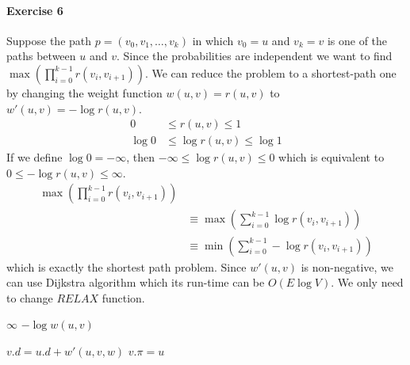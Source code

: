 \documentclass{book}
\begin{document}
	\paragraph{Exercise 6}
	Suppose the path $p = (v_0, v_1, \dots, v_k)$ in which $v_0 = u$ and $v_k = v$ is one of the paths between $u$ and $v$. Since the probabilities are independent we want to find $\max(\prod_{i = 0}^{k - 1}r(v_i, v_{i+1}))$. We can reduce the problem to a shortest-path one by changing the weight function $w(u, v) = r(u, v)$ to $w'(u, v) = -\log{r(u, v)}$.
	\begin{equation*}
	\begin{split}
		0 &\le r(u, v) \le 1 \\
		\log 0 &\le \log{r(u, v)} \le \log 1
	\end{split}
	\end{equation*}
	If we define $\log 0 = -\infty$, then $-\infty \le \log{r(u, v)} \le 0$ which is equivalent to $0 \le -\log{r(u, v)} \le \infty$.
	\begin{equation*}
	\begin{split}
		\max(\prod_{i = 0}^{k - 1}r(v_i, v_{i+1})) \\
		&\equiv \max(\sum_{i = 0}^{k - 1}\log{r(v_i, v_{i+1})}) \\
		&\equiv \min(\sum_{i = 0}^{k - 1}-\log{r(v_i, v_{i+1})})
	\end{split}
	\end{equation*}
	which is exactly the shortest path problem. Since $w'(u, v)$ is non-negative, we can use Dijkstra algorithm which its run-time can be $O(E\log V)$. We only need to change $RELAX$ function.
	\begin{algorithm*}[h!]
		\begin{algorithmic}[1]
					\State \Return $\infty$
				\Else
					\State \Return $-\log{w(u, v)}$
				\EndIf
			\EndFunction
		\end{algorithmic}
	\end{algorithm*}
	\begin{algorithm*}
		\begin{algorithmic}[1]
					\State $v.d = u.d + w'(u, v, w)$
					\State $v.\pi = u$
				\EndIf
			\EndFunction
		\end{algorithmic}
	\end{algorithm*}	
	\FloatBarrier
	
	\label{psec:ShortestPathClassification}	
\end{document}
